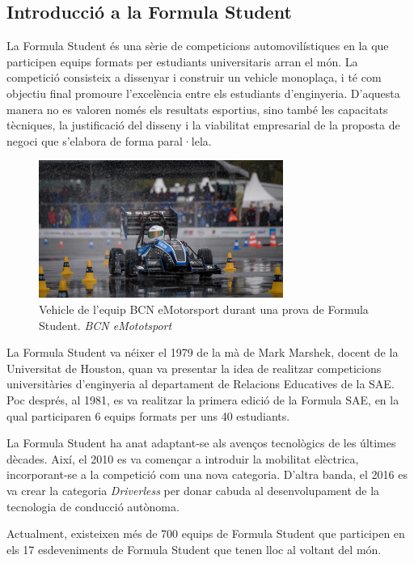 \subsection{ Introducció a la Formula Student }
{
    La Formula Student és una sèrie de competicions automovilístiques en la que
    participen equips formats per estudiants universitaris arran el món. La
    competició consisteix a dissenyar i construir un vehicle monoplaça, i té
    com objectiu final promoure l'excelència entre els estudiants d'enginyeria.
    D'aquesta manera no es valoren només els resultats esportius, sino també
    les capacitats tècniques, la justificació del disseny i la viabilitat
    empresarial de la proposta de negoci que s'elabora de forma paral·lela.

    \begin{figure}[!htb]
        \centering
        \captionsetup{justification=centering,margin=1.5cm}
        \includegraphics[width=8cm]
            { img/2_formula_student/foto_guay.jpg } 
        \caption[Competició de Formula Student. \emph{BCN eMototsport}]
        { 
            Vehicle de l'equip BCN eMotorsport durant una prova de
            Formula Student. \emph{BCN eMototsport} 
        }
    \end{figure}
    
    La Formula Student va néixer el 1979 de la mà de Mark Marshek, docent de la
    Universitat de Houston, quan va presentar la idea de realitzar competicions
    universitàries d'enginyeria al departament de Relacions Educatives de la
    \ac{SAE}. Poc després, al 1981, es va realitzar la primera edició de la
    Formula \ac{SAE}, en la qual participaren 6 equips formats per uns 40
    estudiants.\cite{formula_student}

    La Formula Student ha anat adaptant-se als avenços tecnològics de les
    últimes dècades. Així, el 2010 es va començar a introduir la mobilitat
    elèctrica, incorporant-se a la competició com una nova categoria. D'altra
    banda, el 2016 es va crear la categoria \emph{Driverless} per donar cabuda
    al desenvolupament de la tecnologia de conducció autònoma.

    Actualment, existeixen més de 700 equips de Formula Student que participen
    en els 17 esdeveniments de Formula Student que tenen lloc al voltant del
    món.
}

